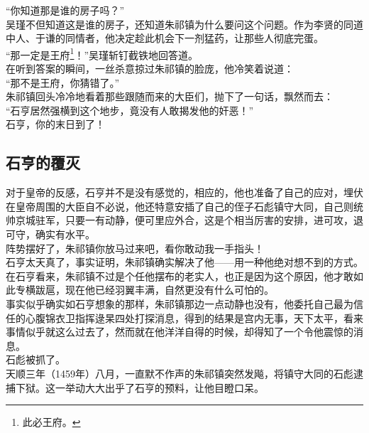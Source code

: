 \begin{multicols}{\theparacolNo}
“你知道那是谁的房子吗？”\\

吴瑾不但知道这是谁的房子，还知道朱祁镇为什么要问这个问题。作为李贤的同道中人、于谦的同情者，他决定趁此机会下一剂猛药，让那些人彻底完蛋。\\

“那一定是王府\footnote{此必王府。}！”吴瑾斩钉截铁地回答道。\\

在听到答案的瞬间，一丝杀意掠过朱祁镇的脸庞，他冷笑着说道：\\

“那不是王府，你猜错了。”\\

朱祁镇回头冷冷地看着那些跟随而来的大臣们，抛下了一句话，飘然而去：\\

“石亨居然强横到这个地步，竟没有人敢揭发他的奸恶！”\\

石亨，你的末日到了！\\

\subsection{石亨的覆灭}
对于皇帝的反感，石亨并不是没有感觉的，相应的，他也准备了自己的应对，埋伏在皇帝周围的大臣自不必说，他还特意安插了自己的侄子石彪镇守大同，自己则统帅京城驻军，只要一有动静，便可里应外合，这是个相当厉害的安排，进可攻，退可守，确实有水平。\\

阵势摆好了，朱祁镇你放马过来吧，看你敢动我一手指头！\\

石亨太天真了，事实证明，朱祁镇确实解决了他——用一种他绝对想不到的方式。\\

在石亨看来，朱祁镇不过是个任他摆布的老实人，也正是因为这个原因，他才敢如此专横跋扈，现在他已经羽翼丰满，自然更没有什么可怕的。\\

事实似乎确实如石亨想象的那样，朱祁镇那边一点动静也没有，他委托自己最为信任的心腹锦衣卫指挥逯杲四处打探消息，得到的结果是宫内无事，天下太平，看来事情似乎就这么过去了，然而就在他洋洋自得的时候，却得知了一个令他震惊的消息。\\

石彪被抓了。\\

天顺三年（1459年）八月，一直默不作声的朱祁镇突然发飚，将镇守大同的石彪逮捕下狱。这一举动大大出乎了石亨的预料，让他目瞪口呆。\\


\end{multicols}
